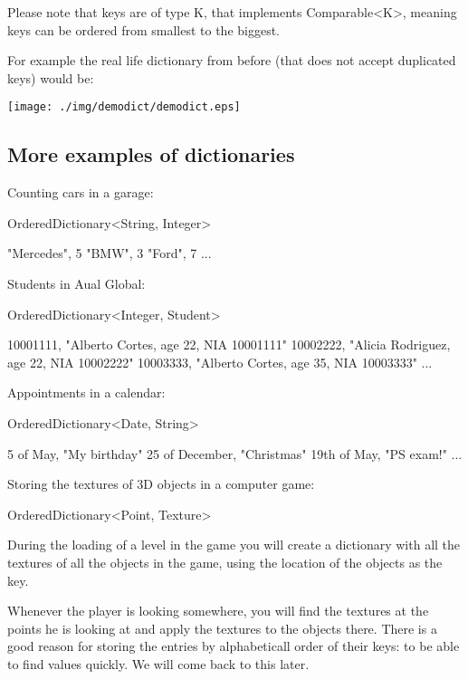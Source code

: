 \documentclass[a4paper, 9pt]{extarticle}
\newcommand{\separator}{\begin{center}%
\noindent\makebox[\linewidth]{\rule{0.75\paperwidth}{0.4pt}}%
\end{center}}
\begin{document}
Please note that keys are of type K, that implements Comparable<K>, meaning
keys can be ordered from smallest to the biggest.

For example the real life dictionary from before (that does not accept duplicated keys) would be:

\begin{center}
  \texttt{[image: ./img/demodict/demodict.eps]}
\end{center}

\subsection{More examples of dictionaries}

Counting cars in a garage:

\begin{blackboard}
OrderedDictionary<String, Integer>

"Mercedes", 5
"BMW", 3
"Ford", 7
...
\end{blackboard}

\separator

Students in Aual Global:

\begin{blackboard}
OrderedDictionary<Integer, Student>

10001111, "Alberto Cortes, age 22, NIA 10001111"
10002222, "Alicia Rodriguez, age 22, NIA 10002222"
10003333, "Alberto Cortes, age 35, NIA 10003333"
...
\end{blackboard}

\separator

Appointments in a calendar:

\begin{blackboard}
OrderedDictionary<Date, String>

5 of May, "My birthday"
25 of December, "Christmas"
19th of May, "PS exam!"
...
\end{blackboard}

\separator

Storing the textures of 3D objects in a computer game:

\begin{blackboard}
OrderedDictionary<Point, Texture>
\end{blackboard}

During the loading of a level in the game you will create a dictionary with all
the textures of all the objects in the game, using the location of the objects
as the key.

Whenever the player is looking somewhere, you will find the textures at the
points he is looking at and apply the textures to the objects there.  There is
a good reason for storing the entries by alphabeticall order of their keys: to
be able to find values quickly. We will come back to this later.
\end{document}
